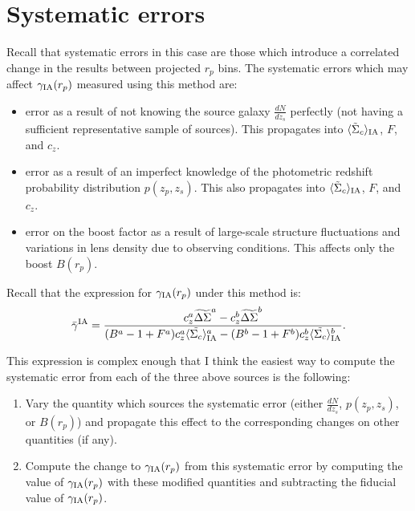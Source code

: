 \documentclass[onecolumn,amsmath,aps,fleqn, superscriptaddress]{revtex4}
\begin{document}
\section{Systematic errors}
Recall that systematic errors in this case are those which introduce a correlated change in the results between projected $r_p$ bins. The systematic errors which may affect $\gamma_{\rm IA}(r_p)$ measured using this method are:
\begin{itemize}
\item{error as a result of not knowing the source galaxy $\frac{dN}{dz_s}$ perfectly (not having a sufficient representative sample of sources). This propagates into $\langle \tilde{\Sigma}_c\rangle_{\rm IA}$, $F$, and $c_z$.}
\item{error as a result of an imperfect knowledge of the photometric redshift probability distribution $p(z_p, z_s)$. This also propagates into $\langle \tilde{\Sigma}_c\rangle_{\rm IA}$, $F$, and $c_z$.}
\item{error on the boost factor as a result of large-scale structure fluctuations and variations in lens density due to observing conditions. This affects only the boost $B(r_p)$.}
\end{itemize}

Recall that the expression for $\gamma_{\rm IA}(r_p)$ under this method is:
\begin{equation}
\bar{\gamma}^{\rm IA} = \frac{c_z^a \widetilde{\Delta\Sigma}^a - c_z^b \widetilde{\Delta\Sigma}^b}{(B^a-1+F^a)c_z^a \langle \tilde{\Sigma_c}\rangle_{\rm IA}^a -(B^b-1+F^b)c_z^b \langle \tilde{\Sigma_c}\rangle_{\rm IA}^b}.
\label{gamma_sol}
\end{equation}

This expression is complex enough that I think the easiest way to compute the systematic error from each of the three above sources is the following:
\begin{enumerate}
\item{Vary the quantity which sources the systematic error (either $\frac{dN}{dz_s}$, $p(z_p, z_s)$, or $B(r_p)$) and propagate this effect to the corresponding changes on other quantities (if any).}
\item{Compute the change to $\gamma_{\rm IA}(r_p)$ from this systematic error by computing the value of $\gamma_{\rm IA}(r_p)$ with these modified quantities and subtracting the fiducial value of $\gamma_{\rm IA}(r_p)$.}
\end{enumerate}
\end{document}
